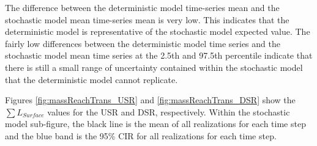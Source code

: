 The difference between the deterministic model time-series mean and the stochastic model mean time-series mean is very low.  This indicates that the deterministic model is representative of the stochastic model expected value.  The fairly low differences between the deterministic model time series and the stochastic model mean time series at the 2.5th and 97.5th percentile indicate that there is still a small range of uncertainty contained within the stochastic model that the deterministic model cannot replicate.


Figures \ref{fig:massReachTrans_USR} and \ref{fig:massReachTrans_DSR} show the $ \sum L_{Surface} $ values for the USR and DSR, respectively.  Within the stochastic model sub-figure, the black line is the mean of all realizations for each time step and the blue band is the 95\% CIR for all realizations for each time step.

